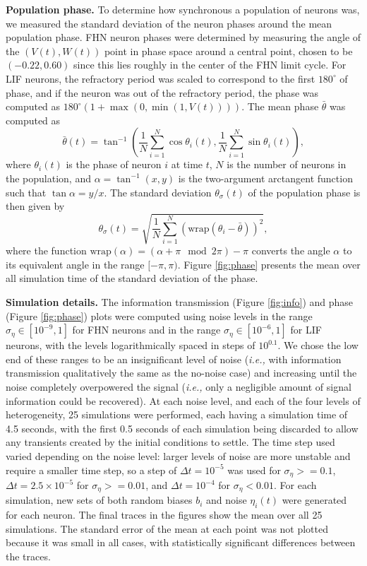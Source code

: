 \documentclass[12pt]{article}
\newcommand{\ie}{\emph{i.e., }}
\newcommand{\fig}[1]{Figure \ref{fig:#1}}
\begin{document}
\textbf{Population phase.} To determine how synchronous a population of neurons was, we measured the standard deviation of the neuron phases around the mean population phase. FHN neuron phases were determined by measuring the angle of the $(V(t),W(t))$ point in phase space around a central point, chosen to be $(-0.22,0.60)$ since this lies roughly in the center of the FHN limit cycle. For LIF neurons, the refractory period was scaled to correspond to the first $180^\circ$ of phase, and if the neuron was out of the refractory period, the phase was computed as $180^\circ ( 1 + \max(0,\min(1,V(t))) )$. The mean phase $\bar\theta$ was computed as
\begin{equation}
  \bar\theta(t) = \tan^{-1} \left( \frac{1}{N}\sum\limits_{i=1}^N \cos\theta_i(t), 
                                  \frac{1}{N}\sum\limits_{i=1}^N \sin\theta_i(t) \right),
\end{equation}
where $\theta_i(t)$ is the phase of neuron $i$ at time $t$, $N$ is the number of neurons in the population, and $\alpha = \tan^{-1}(x,y)$ is the two-argument arctangent function such that $\tan\alpha = y/x$. The standard deviation $\theta_\sigma(t)$ of the population phase is then given by
\begin{equation}
  \theta_\sigma(t) = \sqrt{ \frac{1}{N} \sum\limits_{i=1}^N (\mathrm{wrap}(\theta_i - \bar\theta))^2 },
\end{equation}
where the function $\mathrm{wrap}(\alpha) = (\alpha + \pi \mod 2\pi) - \pi$ converts the angle $\alpha$ to its equivalent angle in the range $[-\pi,\pi)$. \fig{phase} presents the mean over all simulation time of the standard deviation of the phase.

\textbf{Simulation details.} The information transmission (\fig{info}) and phase (\fig{phase}) plots were computed using noise levels in the range $\sigma_\eta \in [10^{-9},1]$ for FHN neurons and in the range $\sigma_\eta \in [10^{-6},1]$ for LIF neurons, with the levels logarithmically spaced in steps of $10^{0.1}$. We chose the low end of these ranges to be an insignificant level of noise (\ie with information transmission qualitatively the same as the no-noise case) and increasing until the noise completely overpowered the signal (\ie only a negligible amount of signal information could be recovered). At each noise level, and each of the four levels of heterogeneity, 25 simulations were performed, each having a simulation time of 4.5 seconds, with the first 0.5 seconds of each simulation being discarded to allow any transients created by the initial conditions to settle. The time step used varied depending on the noise level: larger levels of noise are more unstable and require a smaller time step, so a step of $\Delta t = 10^{-5}$ was used for $\sigma_\eta >= 0.1$, $\Delta t = 2.5 \times 10^{-5}$ for $\sigma_\eta >= 0.01$, and $\Delta t = 10^{-4}$ for $\sigma_\eta < 0.01$. For each simulation, new sets of both random biases $b_i$ and noise $\eta_i(t)$ were generated for each neuron. The final traces in the figures show the mean over all 25 simulations. The standard error of the mean at each point was not plotted because it was small in all cases, with statistically significant differences between the traces.
\end{document}
